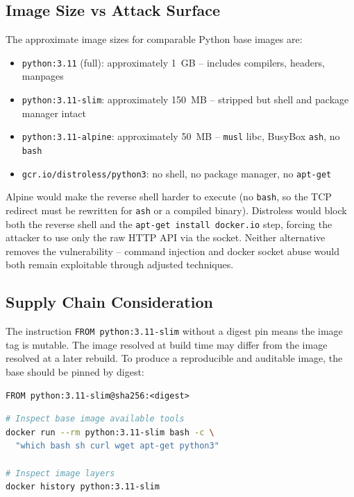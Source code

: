 \subsection*{Image Size vs Attack Surface}

The approximate image sizes for comparable Python base images are:

\begin{itemize}
    \item \texttt{python:3.11} (full): approximately 1~GB -- includes compilers, headers, manpages
    \item \texttt{python:3.11-slim}: approximately 150~MB -- stripped but shell and package manager intact
    \item \texttt{python:3.11-alpine}: approximately 50~MB -- \texttt{musl} libc, BusyBox \texttt{ash}, no \texttt{bash}
    \item \texttt{gcr.io/distroless/python3}: no shell, no package manager, no \texttt{apt-get}
\end{itemize}

Alpine would make the reverse shell harder to execute (no \texttt{bash}, so the TCP redirect must be rewritten for \texttt{ash} or a compiled binary). Distroless would block both the reverse shell and the \texttt{apt-get install docker.io} step, forcing the attacker to use only the raw HTTP API via the socket. Neither alternative removes the vulnerability -- command injection and docker socket abuse would both remain exploitable through adjusted techniques.

\subsection*{Supply Chain Consideration}

The instruction \texttt{FROM python:3.11-slim} without a digest pin means the image tag is mutable. The image resolved at build time may differ from the image resolved at a later rebuild. To produce a reproducible and auditable image, the base should be pinned by digest:

\begin{lstlisting}[language=docker]
FROM python:3.11-slim@sha256:<digest>
\end{lstlisting}

\begin{lstlisting}[language=bash]
# Inspect base image available tools
docker run --rm python:3.11-slim bash -c \
  "which bash sh curl wget apt-get python3"

# Inspect image layers
docker history python:3.11-slim
\end{lstlisting}

